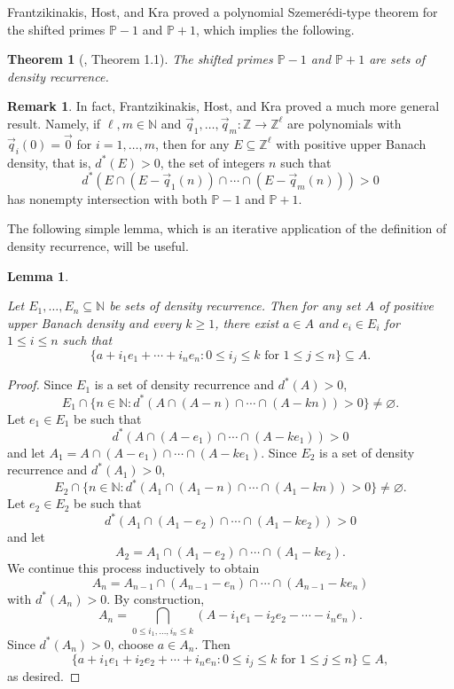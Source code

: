 \documentclass{amsart}
\newtheorem{theorem}{Theorem}
\newtheorem{lemma}{Lemma}
\theoremstyle{definition}
\newtheorem{remark}{Remark}
\begin{document}
Frantzikinakis, Host, and Kra proved a polynomial Szemerédi-type theorem for the shifted primes $\mathbb{P}-1$ and $\mathbb{P}+1$, which implies the following.

\begin{theorem}[\cite{frantzikinakis2013polynomial}, Theorem 1.1]\label{thm:frant}
The shifted primes $\mathbb{P}-1$ and $\mathbb{P}+1$ are sets of density recurrence. 
\end{theorem}

\begin{remark} 

In fact, Frantzikinakis, Host, and Kra proved a much more general result. Namely, if $\ell,m \in \mathbb{N}$ and $\vec{q}_1,\dots,\vec{q}_m:\mathbb{Z}\to \mathbb{Z}^{\ell}$ 
are polynomials with $\vec{q}_i(0)=\vec{0}$ for $i=1,\dots,m$, then for any $E\subseteq \mathbb{Z}^{\ell}$ with positive upper Banach density, 
that is, $d^*(E)>0$, the set of integers $n$ such that
$$
d^*\left(
E\cap (E-\vec{q}_1(n))\cap \cdots \cap (E-\vec{q}_m(n))
\right)>0
$$
has nonempty intersection with both $\mathbb{P}-1$ and $\mathbb{P}+1$.
    
\end{remark}

The following simple lemma, which is an iterative application of the definition of density recurrence, will be useful.

\begin{lemma}\label{lem:density-grid}

Let $E_1,\dots,E_n \subseteq \mathbb{N}$ be sets of density recurrence. Then for any set $A$ of positive upper Banach density and every $k \geq 1$, there exist $a \in A$ and $e_i \in E_i$ for $1 \leq i \leq n$ such that $$ \{a+i_1e_1+\cdots+i_ne_n : 0 \leq i_j \leq k \text{ for } 1 \leq j \leq n\} \subseteq A. $$

\end{lemma}

\begin{proof}

Since $E_1$ is a set of density recurrence and $d^*(A)>0$, $$E_1 \cap\{n \in \mathbb{N} : d^*(A \cap (A-n) \cap \cdots \cap (A-kn))>0\} \neq \varnothing.$$ Let $e_1 \in E_1$ be such that $$d^*(A \cap (A-e_1) \cap \cdots \cap (A-ke_1))>0$$ and let $A_1=A \cap (A -e_1) \cap \cdots \cap (A-ke_1)$. Since $E_2$ is a set of density recurrence and $d^*(A_1)>0$, $$E_2 \cap \{n \in \mathbb{N} : d^*(A_1 \cap (A_1-n) \cap \cdots \cap (A_1-kn))>0\} \neq \varnothing.$$ Let $e_2 \in E_2$ be such that $$d^*(A_1 \cap (A_1-e_2) \cap \cdots \cap (A_1-ke_2))>0$$ and let $$A_2=A_1 \cap (A_1-e_2) \cap \cdots \cap (A_1-ke_2).$$ We continue this process inductively to obtain $$A_n=A_{n-1} \cap (A_{n-1}-e_n) \cap \cdots \cap (A_{n-1}-ke_n)$$ with $d^*(A_n)>0$. By construction, $$A_n=\bigcap_{0 \leq i_1,\dots,i_n \leq k}(A-i_1e_1-i_2e_2 - \cdots - i_ne_n).$$ Since $d^*(A_n)>0$, choose $a \in A_n$. Then $$ \{a+i_1e_1+i_2e_2+\cdots+i_ne_n : 0 \leq i_j \leq k \text{ for } 1 \leq j \leq n\} \subseteq A, $$ as desired. \end{proof}
    
\end{document}
